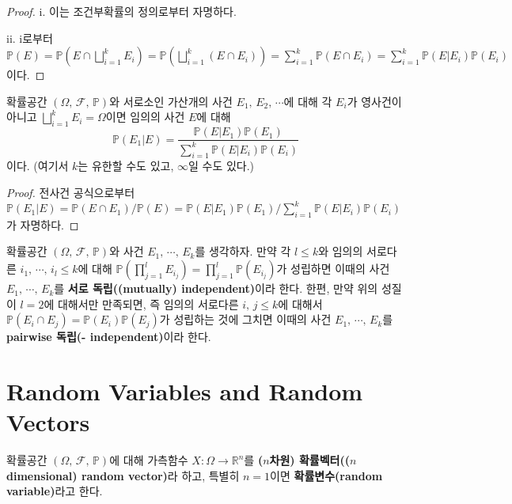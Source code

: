 \begin{proof}
    i. 이는 조건부확률의 정의로부터 자명하다.
    
    ii. i로부터 $\mathbb{P}(E)=\mathbb{P}(E\cap\bigsqcup_{i=1}^kE_i)=\mathbb{P}(\bigsqcup_{i=1}^k(E\cap E_i))=\sum_{i=1}^k\mathbb{P}(E\cap E_i)=\sum_{i=1}^k\mathbb{P}(E\vert E_i)\mathbb{P}(E_i)$이다.
\end{proof}

\begin{theorem}[Bayes]
    확률공간 $(\Omega,\,\mathcal{F},\,\mathbb{P})$와 서로소인 가산개의 사건 $E_1,\,E_2,\,\cdots$에 대해 각 $E_i$가 영사건이 아니고 $\bigsqcup_{i=1}^kE_i=\Omega$이면 임의의 사건 $E$에 대해
    \begin{equation*}
        \mathbb{P}(E_1\vert E)=\frac{\mathbb{P}(E\vert E_1)\mathbb{P}(E_1)}{\sum_{i=1}^k\mathbb{P}(E\vert E_i)\mathbb{P}(E_i)}
    \end{equation*}
    이다. (여기서 $k$는 유한할 수도 있고, $\infty$일 수도 있다.)
\end{theorem}

\begin{proof}
    전사건 공식으로부터 $\mathbb{P}(E_1\vert E)=\mathbb{P}(E\cap E_1)/\mathbb{P}(E)=\mathbb{P}(E\vert E_1)\mathbb{P}(E_1)/\sum_{i=1}^k\mathbb{P}(E\vert E_i)\mathbb{P}(E_i)$가 자명하다.
\end{proof}

\begin{definition}
    확률공간 $(\Omega,\,\mathcal{F},\,\mathbb{P})$와 사건 $E_1,\,\cdots,\,E_k$를 생각하자. 만약 각 $l\leq k$와 임의의 서로다른 $i_1,\,\cdots,\,i_l\leq k$에 대해 $\mathbb{P}(\prod_{j=1}^lE_{i_j})=\prod_{j=1}^l\mathbb{P}(E_{i_j})$가 성립하면 이때의 사건 $E_1,\,\cdots,\,E_k$를 \textbf{서로 독립((mutually) independent)}이라 한다. 한편, 만약 위의 성질이 $l=2$에 대해서만 만족되면, 즉 임의의 서로다른 $i,\,j\leq k$에 대해서 $\mathbb{P}(E_i\cap E_j)=\mathbb{P}(E_i)\mathbb{P}(E_j)$가 성립하는 것에 그치면 이때의 사건 $E_1,\,\cdots,\,E_k$를 \textbf{pairwise 독립(- independent)}이라 한다.
\end{definition}

\section{Random Variables and Random Vectors}

\begin{definition}
    확률공간 $(\Omega,\,\mathcal{F},\,\mathbb{P})$에 대해 가측함수 $X:\Omega\to\mathbb{R}^n$를 \textbf{($n$차원) 확률벡터(($n$ dimensional) random vector)}라 하고, 특별히 $n=1$이면 \textbf{확률변수(random variable)}라고 한다.
\end{definition}

